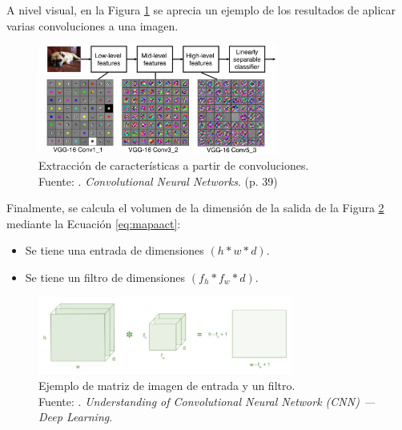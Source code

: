 \begin{itemize}
\begin{itemize}
\begin{itemize}
			A nivel visual, en la Figura \ref{2:fig29} se aprecia un ejemplo de los resultados de aplicar varias convoluciones a una imagen.
			\begin{figure}[h]
				\begin{center}
					\includegraphics[width=0.70\textwidth]{2/figures/features_cnn.jpg}
					\caption[Extracción de características a partir de convoluciones]{Extracción de características a partir de convoluciones.\\
					Fuente: \cite{tec_li2019cnn}. \textit{Convolutional Neural Networks}. (p. 39)}
					\label{2:fig29}
				\end{center}
			\end{figure}
			
			Finalmente, se calcula el volumen de la dimensión de la salida de la Figura \ref{2:fig30} mediante la Ecuación \ref{eq:mapaact}:
			\begin{itemize}
				\item Se tiene una entrada de dimensiones $(h * w * d)$.
				\item Se tiene un filtro de dimensiones $(f_h * f_w * d)$.
			\end{itemize}
			
			\begin{figure}[h]
				\begin{center}
					\includegraphics[width=0.75\textwidth]{2/figures/matriz_cnn.jpg}
					\caption[Ejemplo de matriz de imagen de entrada y un filtro]{Ejemplo de matriz de imagen de entrada y un filtro.\\
					Fuente: \cite{tec_prabhu2018cnn}. \textit{Understanding of Convolutional Neural Network (CNN) — Deep Learning}.}
					\label{2:fig30}
				\end{center}
			\end{figure}
			

\end{itemize}
\end{itemize}
\end{itemize}
